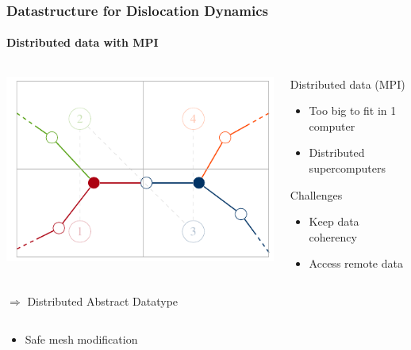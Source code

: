 \documentclass[aspectratio=1610,t,10pt]{beamer}
\begin{document}
\begin{frame}
\frametitle{Datastructure for Dislocation Dynamics}
\framesubtitle{Distributed data with MPI}
\begin{columns}[c]
	\begin{column}{.48\textwidth}
		\centering   		  		
		\includegraphics[width=\textwidth]{img/dislocations-distribuees}
	\end{column}
	\begin{column}{.48\textwidth}
		\begin{block}{Distributed data (MPI)}
			\begin{itemize}
				\item Too big to fit in 1 computer
				\item Distributed supercomputers
			\end{itemize}
		\end{block}
		\begin{block}{Challenges}
			\begin{itemize}
				\item Keep data coherency
				\item Access remote data
			\end{itemize}
		\end{block}
	\end{column}
\end{columns}
\begin{block}{$\Rightarrow$ Distributed Abstract Datatype}
	\begin{columns}[c]
		\begin{column}{.48\textwidth}
			\begin{itemize}
				\item Safe mesh modification

\end{itemize}
\end{column}
\end{columns}
\end{block}
\end{frame}
\end{document}
